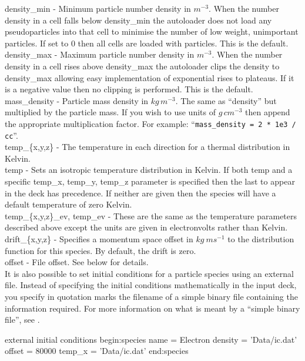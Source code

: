 {\emphtext density\_min} - Minimum particle number density in $m^{-3}$.
When the number density in a cell falls below density\_min the
autoloader does not load any pseudoparticles into that cell to minimise the
number of low weight, unimportant particles. If set to 0 then all cells are
loaded with particles. This is the default.\\

{\emphtext density\_max} - Maximum particle number density in $m^{-3}$.
When the number density in a cell rises above density\_max the
autoloader clips the density to density\_max allowing easy
implementation of exponential rises to plateaus. If it is a negative value
then no clipping is performed. This is the default.\\

{\emphtext mass\_density} - Particle mass density in $kg\,m^{-3}$. The same
as ``density'' but multiplied by the particle mass. If you wish to use units
of $g\,cm^{-3}$ then append the appropriate multiplication factor.
For example: ``\verb|mass_density = 2 * 1e3 / cc|''.\\

{\emphtext temp\_\{x,y,z\}} - The temperature in each direction for a thermal
distribution in Kelvin.\\

{\emphtext temp} - Sets an isotropic temperature distribution in Kelvin.
If both temp and a specific
temp\_x, temp\_y, temp\_z parameter is specified then the last to appear in the
deck has precedence. If neither are given then the species will have a default
temperature of zero Kelvin.\\

{\emphtext temp\_\{x,y,z\}\_ev, temp\_ev} - These are the same as the
temperature parameters described above except the units are given in
electronvolts rather than Kelvin.\\

{\emphtext drift\_\{x,y,z\}} - Specifies a momentum space offset in
$kg\ ms^{-1}$ to the distribution function for this species. By default,
the drift is zero.\\

{\emphtext offset} - File offset. See below for details.\\


It is also possible to set initial conditions for a particle species
using an external file.  Instead of specifying the
initial conditions mathematically in the input deck, you specify in quotation
marks the filename of a simple binary file containing the information required.
For more information on what is meant by a ``simple binary file'', see
.
\begin{lboxverbatim}{external initial conditions}
begin:species
   name = Electron
   density = 'Data/ic.dat'
   offset = 80000
   temp_x = 'Data/ic.dat'
end:species
\end{lboxverbatim}

